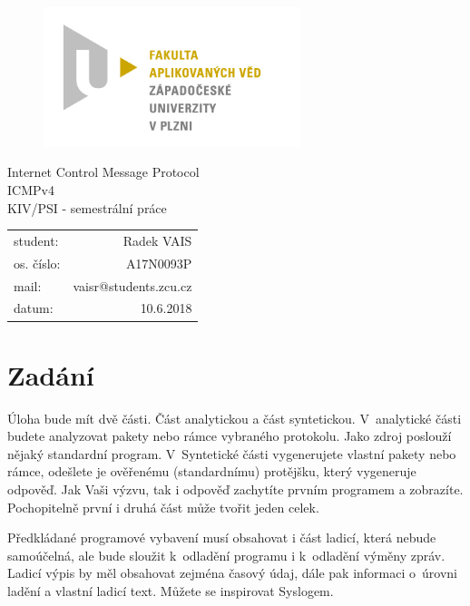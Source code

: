 \documentclass[12pt, a4paper]{article}
\begin{document}
\begin{figure}[h!]
\centering
\includegraphics[width=75mm]{favlogo.jpg}
\end{figure}

{\centering
{\huge Internet Control Message Protocol}\\[1em]
{\large ICMPv4}\\[1em]
{\large KIV/PSI - semestrální práce}\\[11,5cm]
}

\begin{tabular}{l r}
student: & Radek VAIS\\
os. číslo: & A17N0093P\\
mail: & vaisr@students.zcu.cz\\
datum: & 10.6.2018\\
\end{tabular}

\thispagestyle{empty}
\newpage

\section{Zadání} %

Úloha bude mít dvě části. Část analytickou a část syntetickou. V~analytické části budete analyzovat pakety nebo rámce vybraného protokolu. Jako zdroj poslouží nějaký standardní program. V~Syntetické části vygenerujete vlastní pakety nebo rámce, odešlete je ověřenému (standardnímu) protějšku, který vygeneruje odpověď. Jak Vaši výzvu, tak i odpověď zachytíte prvním programem a zobrazíte. Pochopitelně první i druhá část může tvořit jeden celek.

Předkládané programové vybavení musí obsahovat i část ladicí, která nebude samoúčelná, ale bude sloužit k~odladění programu i k~odladění výměny zpráv. Ladicí výpis by měl obsahovat zejména časový údaj, dále pak informaci o~úrovni ladění a vlastní ladicí text. Můžete se inspirovat Syslogem.
\end{document}
